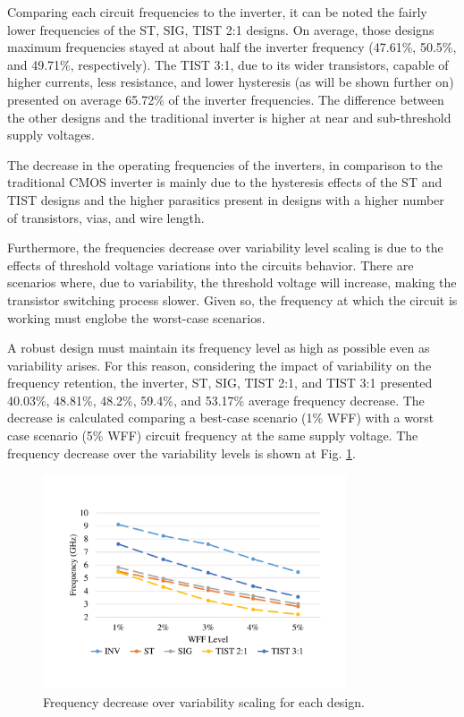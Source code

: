 \documentclass[diss,pgmicro,english]{iiufrgs}
\begin{document}
Comparing each circuit frequencies to the inverter, it can be noted the fairly lower frequencies of the ST, SIG, TIST 2:1 designs. On average, those designs maximum frequencies stayed at about half the inverter frequency (47.61\%, 50.5\%, and 49.71\%, respectively). The TIST 3:1, due to its wider transistors, capable of higher currents,  less resistance, and lower hysteresis (as will be shown further on) presented on average 65.72\% of the inverter frequencies. The difference between the other designs and the traditional inverter is higher at near and sub-threshold supply voltages.

The decrease in the operating frequencies of the inverters, in comparison to the traditional CMOS inverter is mainly due to the hysteresis effects of the ST and TIST designs and the higher parasitics present in designs with a higher number of transistors, vias, and wire length.

Furthermore, the frequencies decrease over variability level scaling is due to the effects of threshold voltage variations into the circuits behavior. There are scenarios where, due to variability, the threshold voltage will increase, making the transistor switching process slower. Given so, the frequency at which the circuit is working must englobe the worst-case scenarios.

A robust design must maintain its frequency level as high as possible even as variability arises. For this reason, considering the impact of variability on the frequency retention, the inverter, ST, SIG, TIST 2:1, and TIST 3:1 presented 40.03\%, 48.81\%, 48.2\%, 59.4\%, and 53.17\% average frequency decrease. The decrease is calculated comparing a best-case scenario (1\% WFF) with a worst case scenario (5\% WFF) circuit frequency at the same supply voltage. The frequency decrease over the variability levels is shown at Fig. \ref{fig:freqRetWFF}.

\begin{figure}[]
\centering
\includegraphics[width=0.8\textwidth, trim={2cm 3cm 2cm 3cm},clip]{freqRetWFF.pdf}
\caption{Frequency decrease over variability scaling for each design.}
\label{fig:freqRetWFF}
\end{figure}
\end{document}
